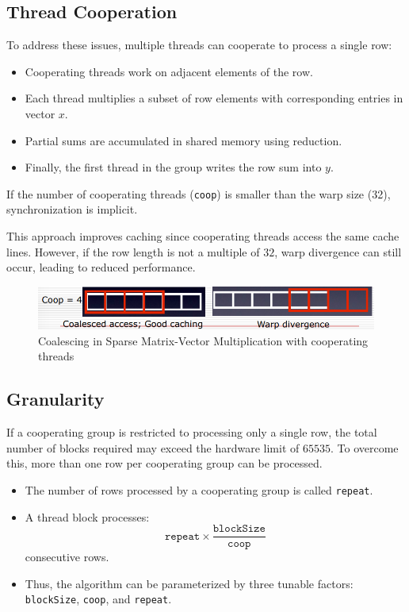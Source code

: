 \documentclass[12pt]{book}
\begin{document}
\subsection*{Thread Cooperation}
To address these issues, multiple threads can cooperate to process a single row:
\begin{itemize}
    \item Cooperating threads work on adjacent elements of the row.
    \item Each thread multiplies a subset of row elements with corresponding entries in vector $x$.
    \item Partial sums are accumulated in shared memory using reduction.
    \item Finally, the first thread in the group writes the row sum into $y$.
\end{itemize}

If the number of cooperating threads (\texttt{coop}) is smaller than the warp size (32), synchronization is implicit.  

This approach improves caching since cooperating threads access the same cache lines. However, if the row length is not a multiple of $32$, warp divergence can still occur, leading to reduced performance.

\begin{figure}[H]
    \centering
    \includegraphics[width=0.55\linewidth]{images/coalsparse.png}
    \caption{Coalescing in Sparse Matrix-Vector Multiplication with cooperating threads}
\end{figure}

\subsection*{Granularity}
If a cooperating group is restricted to processing only a single row, the total number of blocks required may exceed the hardware limit of $65535$. To overcome this, more than one row per cooperating group can be processed.

\begin{itemize}
    \item The number of rows processed by a cooperating group is called \texttt{repeat}.
    \item A thread block processes:
    \[
    \texttt{repeat} \times \frac{\texttt{blockSize}}{\texttt{coop}}
    \]
    consecutive rows.
    \item Thus, the algorithm can be parameterized by three tunable factors: \texttt{blockSize}, \texttt{coop}, and \texttt{repeat}.
\end{itemize}
\end{document}
